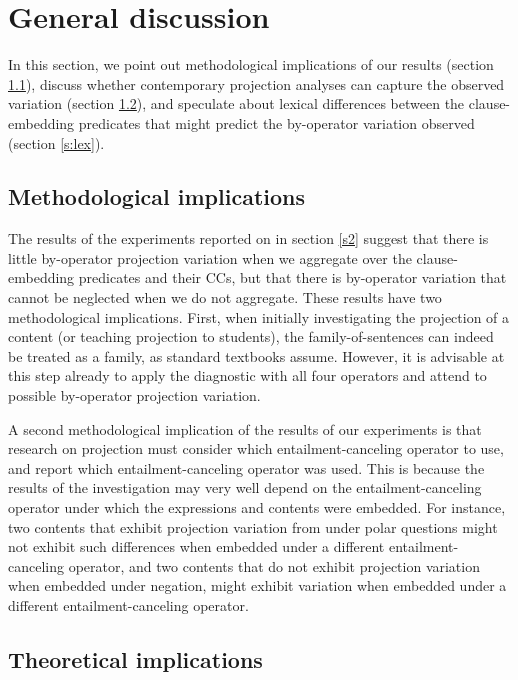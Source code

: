 \documentclass[a4paper,12pt,twoside]{article}
\begin{document}
\section{General discussion}\label{s:general}

In this section, we point out methodological implications of our results (section \ref{s:method-impl}), discuss whether contemporary projection analyses can capture the observed variation (section \ref{s:analysis}), and speculate about lexical differences between the clause-embedding predicates that might predict the by-operator variation observed (section \ref{s:lex}).

\subsection{Methodological implications}\label{s:method-impl}

The results of the experiments reported on in section \ref{s2} suggest that there is little by-operator projection variation when we aggregate over the clause-embedding predicates and their CCs, but that there is by-operator variation that cannot be neglected when we do not aggregate. These results have two methodological implications. First, when initially investigating the projection of a content (or teaching projection to students), the family-of-sentences can indeed be treated as a family, as standard textbooks assume. However, it is advisable at this step already to apply the diagnostic with all four operators and attend to possible by-operator projection variation. 

A second methodological implication of the results of our experiments is that research on projection must consider which entailment-canceling operator to use, and report which entailment-canceling operator was used. This is because the results of the investigation may very well depend on the entailment-canceling operator under which the expressions and contents were embedded. For instance, two contents that exhibit projection variation from under polar questions might not exhibit such differences when embedded under a different entailment-canceling operator, and two contents that do not exhibit projection variation when embedded under negation, might exhibit variation when embedded under a different entailment-canceling operator.

\subsection{Theoretical implications}\label{s:analysis}
\end{document}
